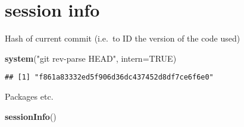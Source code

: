 \documentclass[
]{article}
\newenvironment{Shaded}{\begin{snugshade}}{\end{snugshade}}
\newcommand{\AttributeTok}[1]{\textcolor[rgb]{0.13,0.29,0.53}{#1}}
\newcommand{\ConstantTok}[1]{\textcolor[rgb]{0.56,0.35,0.01}{#1}}
\newcommand{\FunctionTok}[1]{\textcolor[rgb]{0.13,0.29,0.53}{\textbf{#1}}}
\newcommand{\NormalTok}[1]{#1}
\newcommand{\StringTok}[1]{\textcolor[rgb]{0.31,0.60,0.02}{#1}}
\begin{document}
\section{session info}\label{session-info}

Hash of current commit (i.e.~to ID the version of the code used)

\begin{Shaded}
\begin{Highlighting}[]
\FunctionTok{system}\NormalTok{(}\StringTok{"git rev{-}parse HEAD"}\NormalTok{, }\AttributeTok{intern=}\ConstantTok{TRUE}\NormalTok{)}
\end{Highlighting}
\end{Shaded}

\begin{verbatim}
## [1] "f861a83332ed5f906d36dc437452d8df7ce6f6e0"
\end{verbatim}

Packages etc.

\begin{Shaded}
\begin{Highlighting}[]
\FunctionTok{sessionInfo}\NormalTok{()}
\end{Highlighting}
\end{Shaded}
\end{document}

